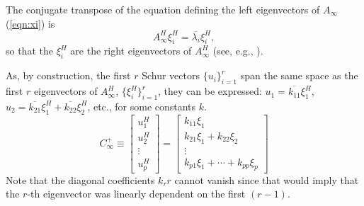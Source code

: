 \documentclass{article}
\begin{document}
The conjugate transpose of the equation defining the left eigenvectors
of $A_\infty$ (\ref{eqn:xi}) is
\begin{equation}
A_\infty^H \xi_i^H = \overline{\lambda_i} \xi_i^H,
\end{equation}
so that the $\xi_i^H$ are the right eigenvectors of $A_\infty^H$ (see,
e.g., \citealp[p.~267]{Stewart73:IMC}).

As, by construction, the first $r$ Schur vectors $\{u_i\}_{i=1}^r$
span the same space as the first $r$ eigenvectors of $A_\infty^H$,
$\{\xi_i^H\}_{i=1}^r$, they can be expressed: $u_1 = \overline{k_{11}}
\xi_1^H$, $u_2 = \overline{k_{21}} \xi_1^H + \overline{k_{22}}
\xi_2^H$, etc., for some constants $k$.
\begin{equation}
C_\infty^+ \equiv \left[\begin{array}{c}
        u_1^H \\
        u_2^H \\
        \vdots \\
        u_p^H           \end{array}\right]
=\left[\begin{array}{c}
        k_{11} \xi_1 \\
        k_{21} \xi_1 + k_{22} \xi_2 \\
        \vdots \\
        k_{p1} \xi_1 +\cdots + k_{pp} \xi_p
                \end{array}\right]
\end{equation}
Note that the diagonal coefficients $k_rr$ cannot vanish since that
would imply that the $r$-th eigenvector was linearly dependent on the
first $(r-1)$.
\end{document}
